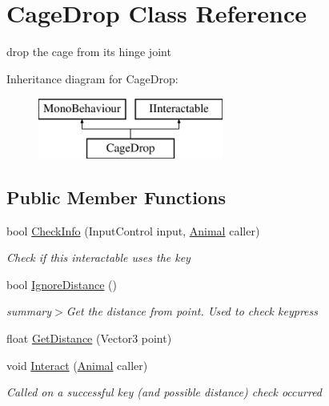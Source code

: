 \hypertarget{class_cage_drop}{}\section{Cage\+Drop Class Reference}
\label{class_cage_drop}


drop the cage from its hinge joint  


Inheritance diagram for Cage\+Drop\+:\begin{figure}[H]
\begin{center}
\leavevmode
\includegraphics[height=2.000000cm]{class_cage_drop}
\end{center}
\end{figure}
\subsection*{Public Member Functions}
\begin{DoxyCompactItemize}
\item 
bool \mbox{\hyperlink{class_cage_drop_a38a96e29aa7e79a26f97e0ddf6480b2e}{Check\+Info}} (Input\+Control input, \mbox{\hyperlink{class_animal}{Animal}} caller)
\begin{DoxyCompactList}\small\item\em Check if this interactable uses the key\end{DoxyCompactList}\item 
bool \mbox{\hyperlink{class_cage_drop_a4f05fa4967d7317ffd43b8e7b9e42e3d}{Ignore\+Distance}} ()
\begin{DoxyCompactList}\small\item\em summary$>$Get the distance from point. Used to check keypress\end{DoxyCompactList}\item 
float \mbox{\hyperlink{class_cage_drop_a57457a58730ee0fbad7693ef9d9a78d7}{Get\+Distance}} (Vector3 point)
\item 
void \mbox{\hyperlink{class_cage_drop_a5832f1672e4475be50319fa8e23f5cbc}{Interact}} (\mbox{\hyperlink{class_animal}{Animal}} caller)
\begin{DoxyCompactList}\small\item\em Called on a successful key (and possible distance) check occurred\end{DoxyCompactList}\end{DoxyCompactItemize}
